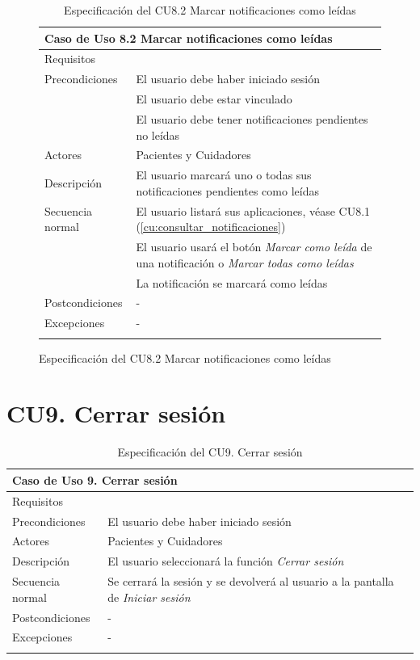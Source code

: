 \begin{figure}[H]
\begin{longtable}{|p{} p{}|}
    \hline
    \multicolumn{2}{|l|}{\textbf{Caso de Uso 8.2 Marcar notificaciones como leídas}} \\ \hline \hline
    Requisitos          & {req:leer_notificaciones} \\ \hline
    Precondiciones      & El usuario debe haber iniciado sesión \\
                        & El usuario debe estar vinculado \\
                        & El usuario debe tener notificaciones pendientes no leídas \\ \hline
    Actores             & Pacientes y Cuidadores \\ \hline
    Descripción         & El usuario marcará uno o todas sus notificaciones pendientes como leídas \\ \hline
    Secuencia normal    & El usuario listará sus aplicaciones, véase CU8.1 (\ref{cu:consultar_notificaciones}) \\
                        & El usuario usará el botón \emph{Marcar como leída} de una notificación o \emph{Marcar todas como leídas} \\
                        & La notificación se marcará como leídas \\ \hline
    Postcondiciones     & - \\ \hline
    Excepciones         & - \\ \hline
    \caption{Especificación del CU8.2 Marcar notificaciones como leídas}
    \label{cu:marcar_notificaciones}
\end{longtable}
\end{figure}

\section{CU9. Cerrar sesión}

\begin{longtable}{|p{} p{}|}
    \hline
    \multicolumn{2}{|l|}{\textbf{Caso de Uso 9. Cerrar sesión}} \\ \hline \hline
    Requisitos          & {req:cierre_sesion} \\ \hline
    Precondiciones      & El usuario debe haber iniciado sesión \\ \hline
    Actores             & Pacientes y Cuidadores \\ \hline
    Descripción         & El usuario seleccionará la función \emph{Cerrar sesión} \\ \hline
    Secuencia normal    & Se cerrará la sesión y se devolverá al usuario a la pantalla de \emph{Iniciar sesión} \\ \hline
    Postcondiciones     & - \\ \hline
    Excepciones         & - \\ \hline
    \caption{Especificación del CU9. Cerrar sesión}
    \label{cu:cerrar_sesion}
\end{longtable}